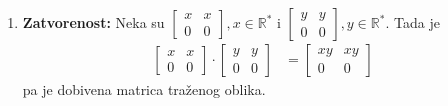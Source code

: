 \documentclass{exam}
\begin{document}
\begin{questions}
\begin{solution}
  \begin{enumerate}
    \item \textbf{Zatvorenost:} Neka su $\displaystyle
      \begin{bmatrix}
        x & x\\
        0 & 0
      \end{bmatrix}, x \in \mathbb{R}^*$ i $\displaystyle
      \begin{bmatrix}
        y & y\\
        0 & 0
      \end{bmatrix}, y \in \mathbb{R}^*$. Tada je
      \begin{align*}
        \begin{bmatrix}
          x & x\\
          0 & 0
        \end{bmatrix} \cdot
        \begin{bmatrix}
          y & y\\
          0 & 0
        \end{bmatrix} &=
        \begin{bmatrix}
          xy & xy\\
          0 & 0
        \end{bmatrix}
      \end{align*}
      pa je dobivena matrica traženog oblika.


\end{enumerate}
\end{solution}
\end{questions}
\end{document}
